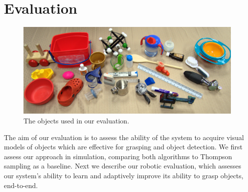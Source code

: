 \documentclass{article}
\begin{document}



\section{Evaluation}
\label{sec:evaluation}

\begin{figure}
\includegraphics[width=1\linewidth]{figures/object_glory_shot.jpg}
\caption{The objects used in our evaluation.\label{fig:object_glory_shot}}
\end{figure}


The aim of our evaluation is to assess the ability of the system to
acquire visual models of objects which are effective for grasping and
object detection.  We first assess our approach in simulation,
comparing both algorithms to Thompson sampling as a baseline.  Next we
describe our robotic evaluation, which assesses our
system's ability to learn and adaptively improve its ability to grasp
objects, end-to-end.
\end{document}

